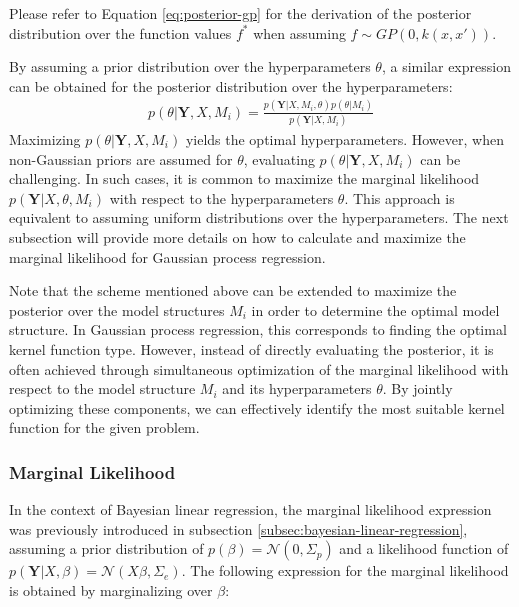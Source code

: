Please refer to Equation \ref{eq:posterior-gp} for the derivation of the posterior distribution over the
function values $f^{\ast}$ when assuming $f \sim GP(0, k(x,x'))$.


By assuming a prior distribution over the hyperparameters $\theta$, a similar expression can be obtained for
the posterior distribution over the hyperparameters:
\begin{gather*}
    p(\theta | \mathbf{Y}, X, M_i) = \frac{p( \mathbf{Y}| X,M_i, \theta)
        p(\theta| M_i)}{p(\mathbf{Y}|X, M_i)}
\end{gather*}
Maximizing $p(\theta | \mathbf{Y}, X, M_i)$ yields the optimal hyperparameters.
However, when non-Gaussian priors are assumed for $\theta$, evaluating $p(\theta | \mathbf{Y}, X, M_i)$
can be challenging.
In such cases, it is common to maximize the marginal likelihood $p(\mathbf{Y} | X, \theta, M_i)$
with respect to the hyperparameters $\theta$.
This approach is equivalent to assuming uniform distributions over the hyperparameters.
The next subsection will provide more details on how to calculate and maximize the
marginal likelihood for Gaussian process regression.

Note that the scheme mentioned above can be extended to maximize the posterior over the model structures
$M_i$ in order to determine the optimal model structure.
In Gaussian process regression, this corresponds to finding the optimal kernel function type.
However, instead of directly evaluating the posterior, it is often achieved through simultaneous optimization of
the marginal likelihood with respect to the model structure $M_i$ and its hyperparameters $\theta$.
By jointly optimizing these components, we can effectively identify the most suitable kernel function for
the given problem.





\subsubsection{Marginal Likelihood}

In the context of Bayesian linear regression, the marginal likelihood expression was previously
introduced in subsection \ref{subsec:bayesian-linear-regression},
assuming a prior distribution of $p(\beta) = \mathcal{N}(0, \Sigma_p)$ and a likelihood function of
$p(\mathbf{Y} | X, \beta) = \mathcal{N}(X \beta, \Sigma_e)$.
The following expression for the marginal likelihood is obtained by marginalizing over $\beta$:

